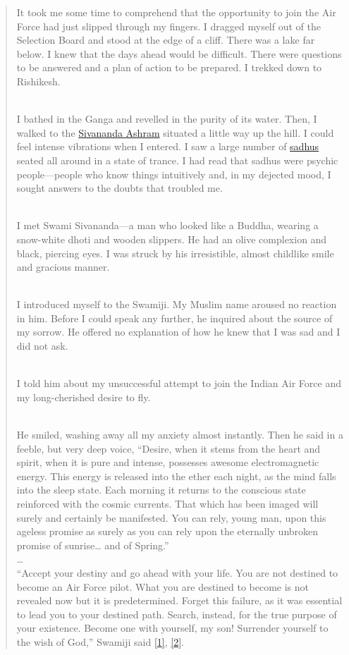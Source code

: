 \documentclass[
  a4paper,
]{article}
\begin{document}
\begin{quote}
It took me some time to comprehend that the opportunity to join the Air
Force had just slipped through my fingers. I dragged myself out of the
Selection Board and stood at the edge of a cliff. There was a lake far
below. I knew that the days ahead would be difficult. There were
questions to be answered and a plan of action to be prepared. I trekked
down to Rishikesh.\\
\strut \\
I bathed in the Ganga and revelled in the purity of its water. Then, I
walked to the
\href{https://en.wikipedia.org/wiki/Divine_Life_Society}{Sivananda
Ashram} situated a little way up the hill. I could feel intense
vibrations when I entered. I saw a large number of
\href{https://en.wikipedia.org/wiki/Sadhu}{sadhus} seated all around in
a state of trance. I had read that sadhus were psychic people---people
who know things intuitively and, in my dejected mood, I sought answers
to the doubts that troubled me.\\
\strut \\
I met Swami Sivananda---a man who looked like a Buddha, wearing a
snow-white dhoti and wooden slippers. He had an olive complexion and
black, piercing eyes. I was struck by his irresistible, almost childlike
smile and gracious manner.\\
\strut \\
I introduced myself to the Swamiji. My Muslim name aroused no reaction
in him. Before I could speak any further, he inquired about the source
of my sorrow. He offered no explanation of how he knew that I was sad
and I did not ask.\\
\strut \\
I told him about my unsuccessful attempt to join the Indian Air Force
and my long-cherished desire to fly.\\
\strut \\
He smiled, washing away all my anxiety almost instantly. Then he said in
a feeble, but very deep voice, ``Desire, when it stems from the heart
and spirit, when it is pure and intense, possesses awesome
electromagnetic energy. This energy is released into the ether each
night, as the mind falls into the sleep state. Each morning it returns
to the conscious state reinforced with the cosmic currents. That which
has been imaged will surely and certainly be manifested. You can rely,
young man, upon this ageless promise as surely as you can rely upon the
eternally unbroken promise of sunrise\ldots{} and of Spring.''\\
\ldots{}\\
``Accept your destiny and go ahead with your life. You are not destined
to become an Air Force pilot. What you are destined to become is not
revealed now but it is predetermined. Forget this failure, as it was
essential to lead you to your destined path. Search, instead, for the
true purpose of your existence. Become one with yourself, my son!
Surrender yourself to the wish of God,'' Swamiji said
\protect\hyperlink{ref-kalam-wof-1999}{{[}1{]}},
\protect\hyperlink{ref-kalam-wof-online}{{[}2{]}}.
\end{quote}
\end{document}
